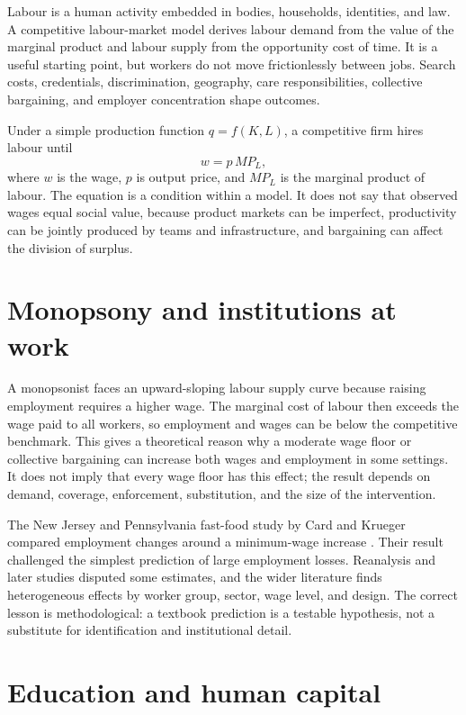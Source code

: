 \documentclass[11pt,oneside,openany]{book}
\begin{document}
Labour is a human activity embedded in bodies, households, identities, and law. A competitive labour-market model derives labour demand from the value of the marginal product and labour supply from the opportunity cost of time. It is a useful starting point, but workers do not move frictionlessly between jobs. Search costs, credentials, discrimination, geography, care responsibilities, collective bargaining, and employer concentration shape outcomes.

Under a simple production function $q=f(K,L)$, a competitive firm hires labour until
\[
  w=p\,MP_L,
\]
where $w$ is the wage, $p$ is output price, and $MP_L$ is the marginal product of labour. The equation is a condition within a model. It does not say that observed wages equal social value, because product markets can be imperfect, productivity can be jointly produced by teams and infrastructure, and bargaining can affect the division of surplus.

\section{Monopsony and institutions at work}

A monopsonist faces an upward-sloping labour supply curve because raising employment requires a higher wage. The marginal cost of labour then exceeds the wage paid to all workers, so employment and wages can be below the competitive benchmark. This gives a theoretical reason why a moderate wage floor or collective bargaining can increase both wages and employment in some settings. It does not imply that every wage floor has this effect; the result depends on demand, coverage, enforcement, substitution, and the size of the intervention.

The New Jersey and Pennsylvania fast-food study by Card and Krueger compared employment changes around a minimum-wage increase \cite{cardkrueger1994}. Their result challenged the simplest prediction of large employment losses. Reanalysis and later studies disputed some estimates, and the wider literature finds heterogeneous effects by worker group, sector, wage level, and design. The correct lesson is methodological: a textbook prediction is a testable hypothesis, not a substitute for identification and institutional detail.

\section{Education and human capital}
\end{document}
